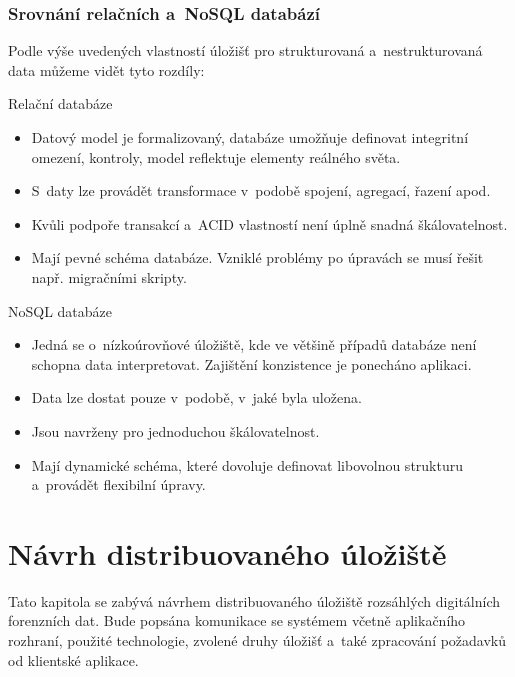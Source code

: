 \subsection{Srovnání relačních a~NoSQL databází}
Podle výše uvedených vlastností úložišť pro strukturovaná a~nestrukturovaná data můžeme vidět tyto rozdíly:

\begin{multicols}{2}

Relační databáze

\begin{itemize}
    \item Datový model je formalizovaný, databáze umožňuje definovat integritní omezení, kontroly, model reflektuje elementy reálného světa.
    
    \item S~daty lze provádět transformace v~podobě spojení, agregací, řazení apod.
    
    \item Kvůli podpoře transakcí a~ACID vlastností není úplně snadná škálovatelnost.
    
    \item Mají pevné schéma databáze. Vzniklé problémy po úpravách se musí řešit např. migračními skripty.
\end{itemize}

\columnbreak

NoSQL databáze

\begin{itemize}
    \item Jedná se o~nízkoúrovňové úložiště, kde ve většině případů databáze není schopna data interpretovat. Zajištění konzistence je ponecháno aplikaci. 
    
    \item Data lze dostat pouze v~podobě, v~jaké byla uložena.
    
    \item Jsou navrženy pro jednoduchou škálovatelnost.
    
    \item Mají dynamické schéma, které dovoluje definovat libovolnou strukturu a~provádět flexibilní úpravy.
\end{itemize}

\end{multicols}

\chapter{Návrh distribuovaného úložiště} \label{distrRepDesignChapter}
Tato kapitola se zabývá návrhem distribuovaného úložiště rozsáhlých digitálních forenzních dat. Bude popsána komunikace se systémem včetně aplikačního rozhraní, použité technologie, zvolené druhy úložišť a~také zpracování požadavků od klientské aplikace.

